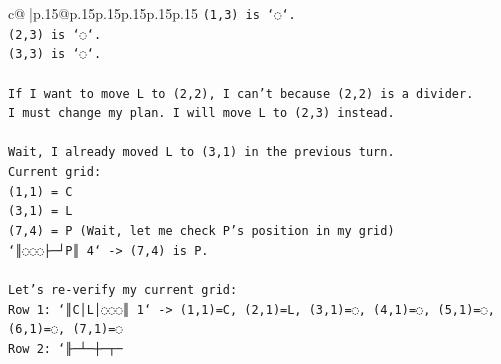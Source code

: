\documentclass{article}
\begin{document}
{\begin{supertabular}{c@{$\;$}|p{.15\linewidth}@{}p{.15\linewidth}p{.15\linewidth}p{.15\linewidth}p{.15\linewidth}p{.15\linewidth}}
{{{\texttt{(1,3) is `◌`.} \\
\texttt{(2,3) is `◌`.} \\
\texttt{(3,3) is `◌`.} \\
\\ 
\texttt{If I want to move L to (2,2), I can't because (2,2) is a divider.} \\
\texttt{I must change my plan. I will move L to (2,3) instead.} \\
\\ 
\texttt{Wait, I already moved L to (3,1) in the previous turn.} \\
\texttt{Current grid:} \\
\texttt{(1,1) = C} \\
\texttt{(3,1) = L} \\
\texttt{(7,4) = P (Wait, let me check P's position in my grid)} \\
\texttt{`║◌◌◌├─┘P║ 4` {-}> (7,4) is P.} \\
\\ 
\texttt{Let's re{-}verify my current grid:} \\
\texttt{Row 1: `║C│L│◌◌◌║ 1` {-}> (1,1)=C, (2,1)=L, (3,1)=◌, (4,1)=◌, (5,1)=◌, (6,1)=◌, (7,1)=◌} \\
\texttt{Row 2: `╟─┴─┼─┬─} \\
            }
        }
    }
     \\ \\


\end{supertabular}}
\end{document}
